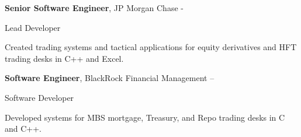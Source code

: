 \documentclass[MMMMyyyy,nonstopmode]{simpleresumecv_stacked}
\newif\ifLOCATION
\begin{document}
\begin{Body}
\Gap
\Entry
\textbf{Senior Software Engineer}, JP Morgan Chase
\hfill 
 - 

Lead Developer
\ifLOCATION
\hfill
New York, New York
\fi

\begin{Detail}
Created trading systems and tactical applications for equity derivatives and HFT trading desks in C++ and Excel.

\end{Detail}

\Entry
\textbf{Software Engineer}, BlackRock Financial Management
\hfill 
 --  

Software Developer
\ifLOCATION
\hfill
New York, New York
\fi

\begin{Detail}
Developed systems for MBS mortgage, Treasury, and Repo trading desks in C and C++.
\end{Detail}

\iffalse
\BigGap
\Entry
\textbf{Prophet 21, Inc.}
\hfill 
Yardley, Pennsylvania

Associate Developer
\hfill
\DatestampYM{1992}{06} --  \DatestampYM{1993}{03}

\begin{Detail}
\BulletItem
Wrote and maintained features for point-of-sale systems targeted to retailers and wholesalers

\Gap
Technologies: Sybase, ksh
\end{Detail}
\fi

\else

\iffalse %
\BigGap
\Entry
\href{http://www.paychex.com/}
{\textbf{Paychex}}

\begin{Detail}
	Led team of 5 to create three public-facing fullstack Java/JavaScript applications.

	Created CI/CD deployment pipelines with Hudson.
\end{Detail}
\fi %


\end{Body}
\end{document}
